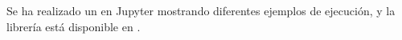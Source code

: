 Se ha realizado un \href{https://github.com/lmd-ugr/Grupos/blob/master/Tutorial.ipynb}{\color{brown2}{tutorial}}
 en Jupyter mostrando diferentes ejemplos de ejecución, y la librería está disponible en \href{https://github.com/lmd-ugr/Grupos}{\color{brown2}{https://github.com/lmd-ugr/Grupos}}.


\endinput
